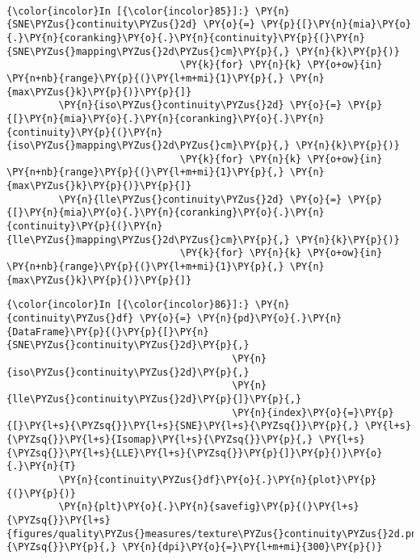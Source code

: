     \begin{center}
    \end{center}
    { \hspace*{\fill} \\}

    \begin{Verbatim}[commandchars=\\\{\}]
{\color{incolor}In [{\color{incolor}85}]:} \PY{n}{SNE\PYZus{}continuity\PYZus{}2d} \PY{o}{=} \PY{p}{[}\PY{n}{mia}\PY{o}{.}\PY{n}{coranking}\PY{o}{.}\PY{n}{continuity}\PY{p}{(}\PY{n}{SNE\PYZus{}mapping\PYZus{}2d\PYZus{}cm}\PY{p}{,} \PY{n}{k}\PY{p}{)}
                              \PY{k}{for} \PY{n}{k} \PY{o+ow}{in} \PY{n+nb}{range}\PY{p}{(}\PY{l+m+mi}{1}\PY{p}{,} \PY{n}{max\PYZus{}k}\PY{p}{)}\PY{p}{]}
         \PY{n}{iso\PYZus{}continuity\PYZus{}2d} \PY{o}{=} \PY{p}{[}\PY{n}{mia}\PY{o}{.}\PY{n}{coranking}\PY{o}{.}\PY{n}{continuity}\PY{p}{(}\PY{n}{iso\PYZus{}mapping\PYZus{}2d\PYZus{}cm}\PY{p}{,} \PY{n}{k}\PY{p}{)}
                              \PY{k}{for} \PY{n}{k} \PY{o+ow}{in} \PY{n+nb}{range}\PY{p}{(}\PY{l+m+mi}{1}\PY{p}{,} \PY{n}{max\PYZus{}k}\PY{p}{)}\PY{p}{]}
         \PY{n}{lle\PYZus{}continuity\PYZus{}2d} \PY{o}{=} \PY{p}{[}\PY{n}{mia}\PY{o}{.}\PY{n}{coranking}\PY{o}{.}\PY{n}{continuity}\PY{p}{(}\PY{n}{lle\PYZus{}mapping\PYZus{}2d\PYZus{}cm}\PY{p}{,} \PY{n}{k}\PY{p}{)}
                              \PY{k}{for} \PY{n}{k} \PY{o+ow}{in} \PY{n+nb}{range}\PY{p}{(}\PY{l+m+mi}{1}\PY{p}{,} \PY{n}{max\PYZus{}k}\PY{p}{)}\PY{p}{]}
\end{Verbatim}

    \begin{Verbatim}[commandchars=\\\{\}]
{\color{incolor}In [{\color{incolor}86}]:} \PY{n}{continuity\PYZus{}df} \PY{o}{=} \PY{n}{pd}\PY{o}{.}\PY{n}{DataFrame}\PY{p}{(}\PY{p}{[}\PY{n}{SNE\PYZus{}continuity\PYZus{}2d}\PY{p}{,}
                                       \PY{n}{iso\PYZus{}continuity\PYZus{}2d}\PY{p}{,}
                                       \PY{n}{lle\PYZus{}continuity\PYZus{}2d}\PY{p}{]}\PY{p}{,}
                                       \PY{n}{index}\PY{o}{=}\PY{p}{[}\PY{l+s}{\PYZsq{}}\PY{l+s}{SNE}\PY{l+s}{\PYZsq{}}\PY{p}{,} \PY{l+s}{\PYZsq{}}\PY{l+s}{Isomap}\PY{l+s}{\PYZsq{}}\PY{p}{,} \PY{l+s}{\PYZsq{}}\PY{l+s}{LLE}\PY{l+s}{\PYZsq{}}\PY{p}{]}\PY{p}{)}\PY{o}{.}\PY{n}{T}
         \PY{n}{continuity\PYZus{}df}\PY{o}{.}\PY{n}{plot}\PY{p}{(}\PY{p}{)}
         \PY{n}{plt}\PY{o}{.}\PY{n}{savefig}\PY{p}{(}\PY{l+s}{\PYZsq{}}\PY{l+s}{figures/quality\PYZus{}measures/texture\PYZus{}continuity\PYZus{}2d.png}\PY{l+s}{\PYZsq{}}\PY{p}{,} \PY{n}{dpi}\PY{o}{=}\PY{l+m+mi}{300}\PY{p}{)}
\end{Verbatim}

